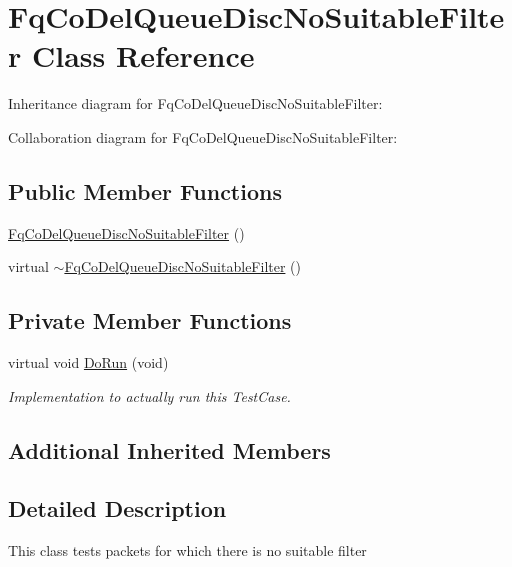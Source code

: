 \hypertarget{classFqCoDelQueueDiscNoSuitableFilter}{}\section{Fq\+Co\+Del\+Queue\+Disc\+No\+Suitable\+Filter Class Reference}
\label{classFqCoDelQueueDiscNoSuitableFilter}


Inheritance diagram for Fq\+Co\+Del\+Queue\+Disc\+No\+Suitable\+Filter\+:


Collaboration diagram for Fq\+Co\+Del\+Queue\+Disc\+No\+Suitable\+Filter\+:
\subsection*{Public Member Functions}
\begin{DoxyCompactItemize}
\item 
\hyperlink{classFqCoDelQueueDiscNoSuitableFilter_ae3cca1afb8bab10d4182de979a565733}{Fq\+Co\+Del\+Queue\+Disc\+No\+Suitable\+Filter} ()
\item 
virtual \hyperlink{classFqCoDelQueueDiscNoSuitableFilter_a865f7a6057f289dca5df3805d7179020}{$\sim$\+Fq\+Co\+Del\+Queue\+Disc\+No\+Suitable\+Filter} ()
\end{DoxyCompactItemize}
\subsection*{Private Member Functions}
\begin{DoxyCompactItemize}
\item 
virtual void \hyperlink{classFqCoDelQueueDiscNoSuitableFilter_a625c4de524420e110231db0610c34526}{Do\+Run} (void)
\begin{DoxyCompactList}\small\item\em Implementation to actually run this Test\+Case. \end{DoxyCompactList}\end{DoxyCompactItemize}
\subsection*{Additional Inherited Members}


\subsection{Detailed Description}
This class tests packets for which there is no suitable filter 

